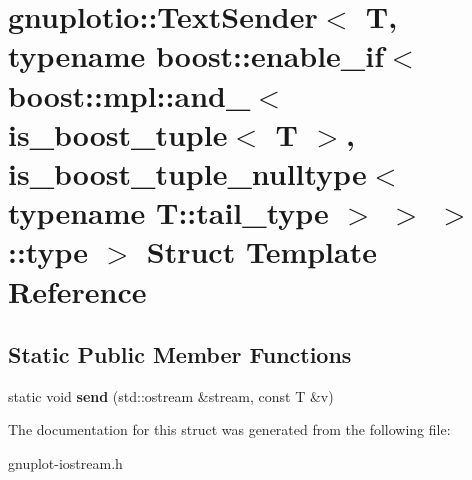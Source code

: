 \hypertarget{structgnuplotio_1_1TextSender_3_01T_00_01typename_01boost_1_1enable__if_3_01boost_1_1mpl_1_1and_bf5c774ba95be74c5a1a563b931819fa}{}\section{gnuplotio\+:\+:Text\+Sender$<$ T, typename boost\+:\+:enable\+\_\+if$<$ boost\+:\+:mpl\+:\+:and\+\_\+$<$ is\+\_\+boost\+\_\+tuple$<$ T $>$, is\+\_\+boost\+\_\+tuple\+\_\+nulltype$<$ typename T\+:\+:tail\+\_\+type $>$ $>$ $>$\+:\+:type $>$ Struct Template Reference}
\label{structgnuplotio_1_1TextSender_3_01T_00_01typename_01boost_1_1enable__if_3_01boost_1_1mpl_1_1and_bf5c774ba95be74c5a1a563b931819fa}
\subsection*{Static Public Member Functions}
\begin{DoxyCompactItemize}
\item 
\mbox{\label{structgnuplotio_1_1TextSender_3_01T_00_01typename_01boost_1_1enable__if_3_01boost_1_1mpl_1_1and_bf5c774ba95be74c5a1a563b931819fa_a76a476180ea04c950c1cfdb71c556525}} 
static void {\bfseries send} (std\+::ostream \&stream, const T \&v)
\end{DoxyCompactItemize}


The documentation for this struct was generated from the following file\+:\begin{DoxyCompactItemize}
\item 
gnuplot-\/iostream.\+h\end{DoxyCompactItemize}
